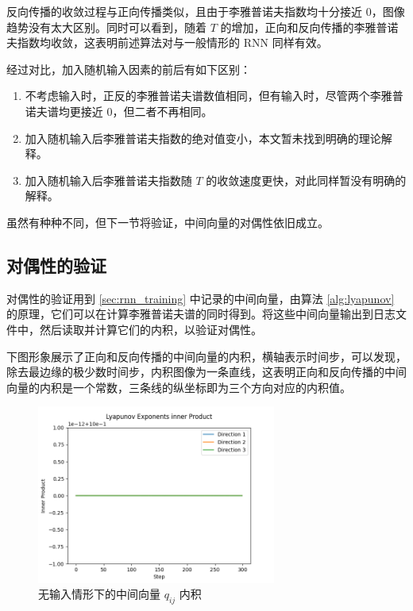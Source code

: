 反向传播的收敛过程与正向传播类似，且由于李雅普诺夫指数均十分接近 0，图像趋势没有太大区别。同时可以看到，随着 $T$ 的增加，正向和反向传播的李雅普诺夫指数均收敛，这表明前述算法对与一般情形的 RNN 同样有效。

经过对比，加入随机输入因素的前后有如下区别：

\begin{enumerate}
  \item 不考虑输入时，正反的李雅普诺夫谱数值相同，但有输入时，尽管两个李雅普诺夫谱均更接近 0，但二者不再相同。
  \item 加入随机输入后李雅普诺夫指数的绝对值变小，本文暂未找到明确的理论解释。
  \item 加入随机输入后李雅普诺夫指数随 $T$ 的收敛速度更快，对此同样暂没有明确的解释。
\end{enumerate}

虽然有种种不同，但下一节将验证，中间向量的对偶性依旧成立。

\subsection{对偶性的验证}\label{sec:duality}

对偶性的验证用到 \ref{sec:rnn_training} 中记录的中间向量，由算法 \ref{alg:lyapunov} 的原理，它们可以在计算李雅普诺夫谱的同时得到。将这些中间向量输出到日志文件中，然后读取并计算它们的内积，以验证对偶性。

下图形象展示了正向和反向传播的中间向量的内积，横轴表示时间步，可以发现，除去最边缘的极少数时间步，内积图像为一条直线，这表明正向和反向传播的中间向量的内积是一个常数，三条线的纵坐标即为三个方向对应的内积值。

\begin{figure}[htbp]
  \centering
  \includegraphics[width=0.7\textwidth]{figures/lyapunov_exponents_inner_product.png}
  \caption{无输入情形下的中间向量 $q_{ij}$ 内积}
  \label{fig:inner_product}
\end{figure}

